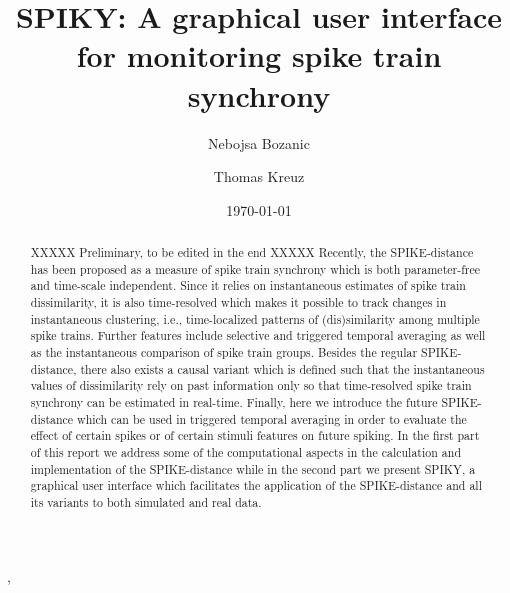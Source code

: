 \documentclass[10pt,twocolumn]{elsart5p}
\begin{document}
\begin{frontmatter}

\title{SPIKY: A graphical user interface for monitoring spike train synchrony}

\author{Nebojsa Bozanic},
\author{Thomas Kreuz}


\address{Institute for complex systems, CNR, Sesto Fiorentino, Italy}


\date{\today}

\begin{abstract}

XXXXX Preliminary, to be edited in the end XXXXX
Recently, the SPIKE-distance has been proposed as a measure of spike train synchrony which is both parameter-free and time-scale independent. Since it relies on instantaneous estimates of spike train dissimilarity, it is also time-resolved which makes it possible to track changes in instantaneous clustering, i.e., time-localized patterns of (dis)similarity among multiple spike trains. Further features include selective and triggered temporal averaging as well as the instantaneous comparison of spike train groups. Besides the regular SPIKE-distance, there also exists a causal variant which is defined such that the instantaneous values of dissimilarity rely on past information only so that time-resolved spike train synchrony can be estimated in real-time. Finally, here we introduce the future SPIKE-distance which can be used in triggered temporal averaging in order to evaluate the effect of certain spikes or of certain stimuli features on future spiking. In the first part of this report we address some of the computational aspects in the calculation and implementation of the SPIKE-distance while in the second part we present SPIKY, a graphical user interface which facilitates the application of the SPIKE-distance and all its variants to both simulated and real data.
 
\end{abstract}



\end{frontmatter}

\newcommand{\abb}{\small\sf}
\maketitle
\end{document}

